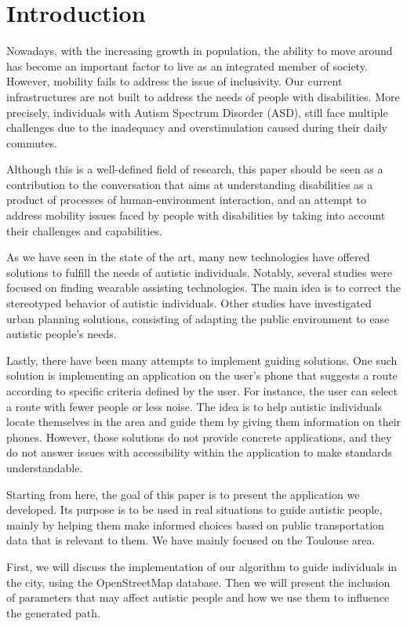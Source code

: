 \section{Introduction}

Nowadays, with the increasing growth in population, the ability to move around has become an important factor to live as an integrated member of society. However, mobility fails to address the issue of inclusivity. Our current infrastructures are not built to address the needs of people with disabilities. More precisely, individuals with Autism Spectrum Disorder (ASD), still face multiple challenges due to the inadequacy and overstimulation caused during their daily commutes.

Although this is a well-defined field of research, this paper should be seen as a contribution to the conversation that aims at understanding disabilities as a product of processes of human-environment interaction, and an attempt to address mobility issues faced by people with disabilities by taking into account their challenges and capabilities.

As we have seen in the state of the art, many new technologies have offered solutions to fulfill the needs of autistic individuals. Notably, several studies were focused on finding wearable assisting technologies. The main idea is to correct the stereotyped behavior of autistic individuals. Other studies have investigated urban planning solutions, consisting of adapting the public environment to ease autistic people's needs.

Lastly, there have been many attempts to implement guiding solutions. One such solution is implementing an application on the user’s phone that suggests a route according to specific criteria defined by the user. For instance, the user can select a route with fewer people or less noise. The idea is to help autistic individuals locate themselves in the area and guide them by giving them information on their phones. However, those solutions do not provide concrete applications, and they do not answer issues with accessibility within the application to make standards understandable.

Starting from here, the goal of this paper is to present the application we developed. Its purpose is to be used in real situations to guide autistic people, mainly by helping them make informed choices based on public transportation data that is relevant to them. We have mainly focused on the Toulouse area.

First, we will discuss the implementation of our algorithm to guide individuals in the city, using the OpenStreetMap database. Then we will present the inclusion of parameters that may affect autistic people and how we use them to influence the generated path.
